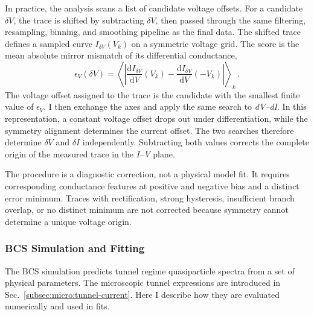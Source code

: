             In practice, the analysis scans a list of candidate voltage offsets. For a candidate $\delta V$, the trace is shifted by subtracting $\delta V$, then passed through the same filtering, resampling, binning, and smoothing pipeline as the final data. The shifted trace defines a sampled curve $I_{\delta V}(V_k)$ on a symmetric voltage grid. The score is the mean absolute mirror mismatch of its differential conductance,
            \begin{equation}
                \epsilon_V(\delta V)
                =
                \left\langle
                    \left|
                        \frac{\mathrm{d}I_{\delta V}}{\mathrm{d}V}(V_k)
                        -
                        \frac{\mathrm{d}I_{\delta V}}{\mathrm{d}V}(-V_k)
                    \right|
                \right\rangle_k\,.
                \label{eq:methods:digital:offset:vscore}
            \end{equation}
            The voltage offset assigned to the trace is the candidate with the smallest finite value of $\epsilon_V$. I then exchange the axes and apply the same search to \textit{dV--dI}. In this representation, a constant voltage offset drops out under differentiation, while the symmetry alignment determines the current offset. The two searches therefore determine $\delta V$ and $\delta I$ independently. Subtracting both values corrects the complete origin of the measured trace in the \textit{I--V} plane.

            The procedure is a diagnostic correction, not a physical model fit. It requires corresponding conductance features at positive and negative bias and a distinct error minimum. Traces with rectification, strong hysteresis, insufficient branch overlap, or no distinct minimum are not corrected because symmetry cannot determine a unique voltage origin.

        \subsubsection*{BCS Simulation and Fitting}

            The BCS simulation predicts tunnel regime quasiparticle spectra from a set of physical parameters. The microscopic tunnel expressions are introduced in Sec.~\ref{subsec:micro:tunnel-current}. Here I describe how they are evaluated numerically and used in fits.

